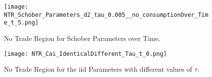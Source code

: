 \documentclass[11pt]{article}
\begin{document}
\begin{figure}[!ht]
    \centering
    \texttt{[image: NTR\_Schober\_Parameters\_d2\_tau\_0.005\_\_no\_consumptionOver\_Time\_t\_5.png]}
    \caption{No Trade Region for Schober Parameters over Time.}
    \label{fig:NTR_2d_iid_standalone}
\end{figure}

\begin{figure}[!ht]
    \centering
    \texttt{[image: NTR\_Cai\_IdenticalDifferent\_Tau\_t\_0.png]}
    \caption{No Trade Region for the iid Parameters with different values of $\tau$.}
    \label{fig:NTR_2d_iid_tau_analysis}
\end{figure}



\ifdefined\COMPILINGMAIN
\else
\end{document}
